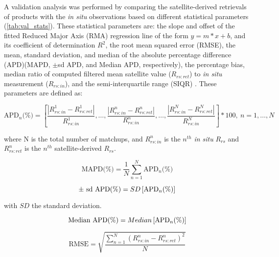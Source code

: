 \documentclass[onecolumn,3p,letterpaper,11pt]{elsarticle}
\begin{document}
A validation analysis was performed by comparing the satellite-derived retrievals of products with the {\it in situ} observations based on different statistical parameters (\autoref{tab:val_stats}). These statistical parameters are: the slope and offset of the fitted Reduced Major Axis (RMA) regression line of the form $y=m*x+b$, and its coefficient of determination $R^2$, the root mean squared error (RMSE), the mean, standard deviation, and median of the absolute percentage difference (APD)(MAPD, $\pm$sd APD, and Median APD, respectively), the percentage bias, median ratio of computed filtered mean satellite value ($R_{rs:ret}$) to {\it in situ} measurement ($R_{rs:in}$), and the semi-interquartile range (SIQR) \citep{Bailey2006}. These parameters are defined as:
\begin{linenomath*}
\begin{equation}
  \text{APD$_n$(\%)}=\left[\frac{\displaystyle \left|R_{rs:in}^1-R_{rs:ret}^1 \right|}{R_{rs:in}^1},\dots,\frac{\displaystyle \left|R_{rs:in}^n-R_{rs:ret}^n \right|}{R_{rs:in}^n},\dots,\frac{\displaystyle \left|R_{rs:in}^N-R_{rs:ret}^N \right|}{R_{rs:in}^N}\right]*100,\ n=1,\dots,N
\end{equation}
\end{linenomath*}
\noindent where N is the total number of matchups, and $R_{rs:in}^n$ is the $n^{th}$ {\it in situ} $R_{rs}$ and $R_{rs:ret}^n$ is the $n^{th}$ satellite-derived $R_{rs}$.
\begin{linenomath*}
\begin{equation}
  \text{MAPD(\%)} = \frac{1}{N} \sum_{n=1}^{N} \text{APD$_n$(\%)}
\end{equation}
\end{linenomath*}
\begin{linenomath*}
\begin{equation}
  \text{$\pm$ \text{sd} APD(\%)} =  SD\left[\text{APD$_n$(\%)}\right]
\end{equation}
\end{linenomath*}
\noindent with $SD$ the standard deviation.
\begin{linenomath*}
\begin{equation}
  \text{\text{Median} APD(\%)} =  Median\left[\text{APD$_n$(\%)}\right]
\end{equation}
\end{linenomath*}
\begin{linenomath*}
\begin{equation}
   \text{RMSE} = \sqrt{\frac{\displaystyle \sum_{n=1}^{N} \left(R_{rs:in}^n-R_{rs:ret}^n\right)^2}{N}}
\end{equation}
\end{linenomath*} 
\end{document}
